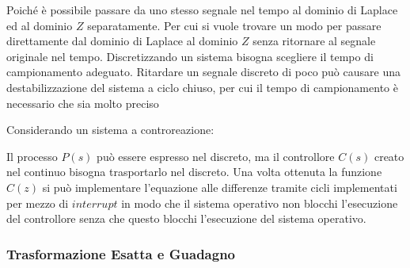 \documentclass{article}
\numberwithin{equation}{subsection}
\begin{document}
Poiché è possibile passare da uno stesso segnale nel tempo al dominio di Laplace ed al dominio $Z$ separatamente. Per cui si vuole trovare un modo per passare direttamente 
dal dominio di Laplace al dominio $Z$ senza ritornare al segnale originale nel tempo. Discretizzando un sistema bisogna scegliere il tempo di campionamento adeguato. Ritardare 
un segnale discreto di poco può causare una destabilizzazione del sistema a ciclo chiuso, per cui il tempo di campionamento è necessario che sia molto preciso 

Considerando un sistema a controreazione:
\begin{center}\end{center} 
Il processo $P(s)$ può essere espresso nel discreto, ma il controllore $C(s)$ creato nel continuo bisogna trasportarlo nel discreto. 
Una volta ottenuta la funzione $C(z)$ si può implementare l'equazione alle differenze tramite cicli implementati per mezzo di $interrupt$ in modo che il sistema operativo 
non blocchi l'esecuzione del controllore senza che questo blocchi l'esecuzione del sistema operativo. 

\subsubsection{Trasformazione Esatta e Guadagno}
\end{document}
